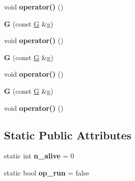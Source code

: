 \begin{DoxyCompactItemize}
void {\bfseries operator()} ()
\item 
\mbox{\label{class_g_aa7cbe260dd651346d376f02b9022eb2b}} 
{\bfseries G} (const \mbox{\hyperlink{class_g}{G}} \&g)
\item 
\mbox{\label{class_g_ade2a739d91a0d727157463ddc0496b60}} 
void {\bfseries operator()} ()
\item 
\mbox{\label{class_g_aa7cbe260dd651346d376f02b9022eb2b}} 
{\bfseries G} (const \mbox{\hyperlink{class_g}{G}} \&g)
\item 
\mbox{\label{class_g_ade2a739d91a0d727157463ddc0496b60}} 
void {\bfseries operator()} ()
\item 
\mbox{\label{class_g_aa7cbe260dd651346d376f02b9022eb2b}} 
{\bfseries G} (const \mbox{\hyperlink{class_g}{G}} \&g)
\item 
\mbox{\label{class_g_ade2a739d91a0d727157463ddc0496b60}} 
void {\bfseries operator()} ()
\end{DoxyCompactItemize}
\subsection*{Static Public Attributes}
\begin{DoxyCompactItemize}
\item 
\mbox{\label{class_g_a2b590f4f81da843d8274fd346c483230}} 
static int {\bfseries n\+\_\+alive} = 0
\item 
\mbox{\label{class_g_a9298088e9d1eb3d2e7dd4fe58bd586e7}} 
static bool {\bfseries op\+\_\+run} = false
\end{DoxyCompactItemize}


